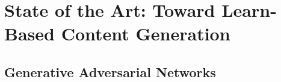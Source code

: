 \chapter{State of the Art: Toward Learn-Based Content Generation}


\section{Generative Adversarial Networks}
